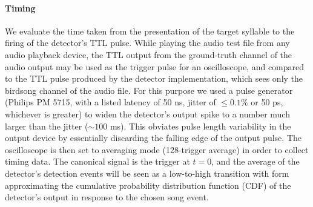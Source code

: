 \documentclass[10pt,letterpaper]{article}
\renewcommand{\subsubsection}[1]{\paragraph{#1}}
\newcommand\argmin{\mathop{\mbox{{\rm argmin}}}\limits}
\newcommand{\noprint}[1]{}
\begin{document}
\noprint{
Since the network
will output values $o_t$ between 0 and 1 at each moment $t$ in an
attempt to match the training output, the optimal threshold
$\tau\in[0,1]$ for the output neuron should be computed.  Given the
relative cost of false positives vs.~false negatives $C$, and the
acceptable time difference between target syllable and correct output
$\Delta t_d$, we compute the optimal threshold for an output element
according to the definitions above:
\begin{eqnarray*}
  \mbox{true positives}_\tau &=& \mbox{size of set}_{s\in \mbox{target songs}} o_t > \tau, \left| t \leq \Delta t_d \right| \\
  \mbox{false negatives}_\tau &=& \mbox{size of set} {s\in\mbox{target songs}} - \mbox{size of set} \mbox{true positives} \\
  \mbox{false positives}_\tau &=& \mbox{size of set}_{s\in \mbox{target songs}} o_t > \tau, \left| t > \Delta t_d \right| \\
  \widehat{\tau} &=& \argmin_\tau C\mbox{false positive} + \mbox{false negatives}
\end{eqnarray*}
}

\subsubsection{Timing}


We evaluate the time taken from the presentation of the target
syllable to the firing of the detector's TTL pulse. While playing the
audio test file from any audio playback device, the TTL
output from the ground-truth channel of the audio output may be used
as the trigger pulse for an oscilloscope, and compared to the TTL pulse
produced by the detector implementation, which sees only the birdsong channel
of the audio file. For this purpose we used a pulse
generator (Philips PM 5715, with a listed latency of 50 ns, jitter 
of $\leq 0.1\%$ or 50 ps, whichever is greater) to widen the
detector's output spike to a number much larger than the jitter ($\sim 100$ ms).  This obviates pulse length variability in the output device by essentially discarding the falling edge of the output pulse.  The oscilloscope is then set to
averaging mode (128-trigger average) in order to collect timing data. The canonical signal is the trigger at $t=0$, and the
average of the detector's detection events will be seen as a
low-to-high transition with form approximating the cumulative
probability distribution function (CDF) of the detector's output in
response to the chosen song event.
\end{document}
